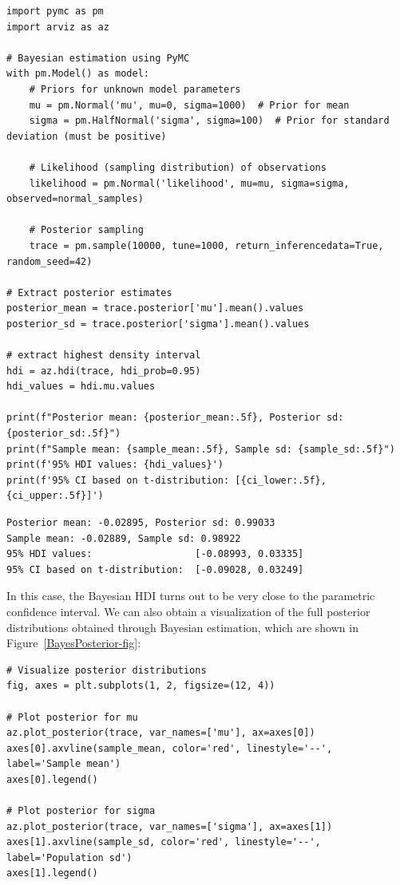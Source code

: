 \begin{lstlisting}[style=Python]
import pymc as pm
import arviz as az

# Bayesian estimation using PyMC
with pm.Model() as model:
    # Priors for unknown model parameters
    mu = pm.Normal('mu', mu=0, sigma=1000)  # Prior for mean
    sigma = pm.HalfNormal('sigma', sigma=100)  # Prior for standard deviation (must be positive)
    
    # Likelihood (sampling distribution) of observations
    likelihood = pm.Normal('likelihood', mu=mu, sigma=sigma, observed=normal_samples)
    
    # Posterior sampling
    trace = pm.sample(10000, tune=1000, return_inferencedata=True, random_seed=42)

# Extract posterior estimates
posterior_mean = trace.posterior['mu'].mean().values
posterior_sd = trace.posterior['sigma'].mean().values

# extract highest density interval
hdi = az.hdi(trace, hdi_prob=0.95)
hdi_values = hdi.mu.values

print(f"Posterior mean: {posterior_mean:.5f}, Posterior sd: {posterior_sd:.5f}")
print(f"Sample mean: {sample_mean:.5f}, Sample sd: {sample_sd:.5f}")
print(f'95% HDI values: {hdi_values}')
print(f'95% CI based on t-distribution: [{ci_lower:.5f}, {ci_upper:.5f}]')
\end{lstlisting}

\begin{lstlisting}[style=shell]
Posterior mean: -0.02895, Posterior sd: 0.99033
Sample mean: -0.02889, Sample sd: 0.98922
95% HDI values:                  [-0.08993, 0.03335]
95% CI based on t-distribution:  [-0.09028, 0.03249]
\end{lstlisting}

In this case, the Bayesian HDI turns out to be very close to the parametric confidence interval. We can also obtain a visualization of the full posterior distributions obtained through Bayesian estimation, which are shown in Figure~\ref{BayesPosterior-fig}:

\begin{lstlisting}[style=Python]
# Visualize posterior distributions
fig, axes = plt.subplots(1, 2, figsize=(12, 4))

# Plot posterior for mu
az.plot_posterior(trace, var_names=['mu'], ax=axes[0])
axes[0].axvline(sample_mean, color='red', linestyle='--', label='Sample mean')
axes[0].legend()

# Plot posterior for sigma
az.plot_posterior(trace, var_names=['sigma'], ax=axes[1])
axes[1].axvline(sample_sd, color='red', linestyle='--', label='Population sd')
axes[1].legend()
\end{lstlisting}

